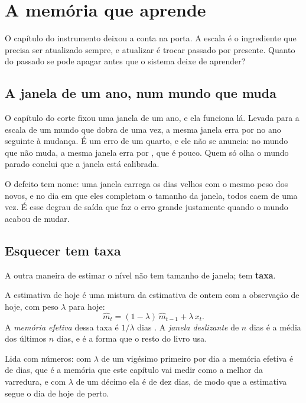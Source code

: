 \chapter{A memória que aprende}\label{cap:memoria}

O capítulo do instrumento deixou a conta na porta. A escala é o ingrediente que precisa ser
atualizado sempre, e atualizar é trocar passado por presente. Quanto do passado se pode apagar antes
que o sistema deixe de aprender?

\section{A janela de um ano, num mundo que muda}

O capítulo do corte fixou uma janela de um ano, e ela funciona lá. Levada
para a escala de um mundo que dobra de uma vez, a mesma janela erra por \numEsquecimentoJanelaDuzentosECinquenta{}
no ano seguinte à mudança. É um erro de um quarto, e ele não se anuncia: no mundo que não muda, a
mesma janela erra por \numEsquecimentoPisoJanelaDuzentosECinquenta{}, que é pouco. Quem só olha o mundo
parado conclui que a janela está calibrada.

O defeito tem nome: uma janela carrega os dias velhos com o mesmo peso dos novos, e no dia em que
eles completam o tamanho da janela, todos caem de uma vez\cite{grossberg2020path}. É esse degrau de saída que faz o erro
grande justamente quando o mundo acabou de mudar.

\section{Esquecer tem taxa}

A outra maneira de estimar o nível não tem tamanho de janela; tem \textbf{taxa}.

\begin{definicao}\label{def:esquecimento}
A estimativa de hoje é uma mistura da estimativa de ontem com a observação de hoje, com peso
$\lambda$ para hoje:
\[
\hat m_t = (1-\lambda)\,\hat m_{t-1} + \lambda\, x_t .
\]
A \emph{memória efetiva} dessa taxa é $1/\lambda$ dias \cite{box2008time}. A \emph{janela deslizante} de $n$ dias é a
média dos últimos $n$ dias, e é a forma que o resto do livro usa.
\end{definicao}

Lida com números: com $\lambda$ de um vigésimo primeiro por dia a memória efetiva é de
\numEsquecimentoMelhorMemoria{} dias, que é a memória que este capítulo vai medir como a melhor da
varredura, e com $\lambda$ de um décimo ela é de dez dias, de modo que a estimativa segue o dia de
hoje de perto.

